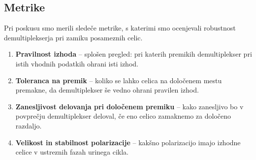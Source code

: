 

% 
% 

\subsection{Metrike}
\label{g27:sec:metrike}

Pri poskusu smo merili sledeče metrike, s katerimi smo ocenjevali robustnost demultiplekserja pri zamiku posameznih celic. 
\begin{enumerate}
    \item \textbf{Pravilnost izhoda} -- splošen pregled: pri katerih premikih demultiplekser pri istih vhodnih podatkih ohrani isti izhod. 
    \item \textbf{Toleranca na premik} -- koliko se lahko celica na določenem mestu premakne, da demultiplekser še vedno ohrani pravilen izhod.
    \item \textbf{Zanesljivost delovanja pri določenem premiku} -- kako zanesljivo bo v povprečju demultiplekser deloval, če eno celico zamaknemo za določeno razdaljo.
    \item \textbf{Velikost in stabilnost polarizacije} -- kakšno polarizacijo imajo izhodne celice v ustreznih fazah urinega cikla.
\end{enumerate}

